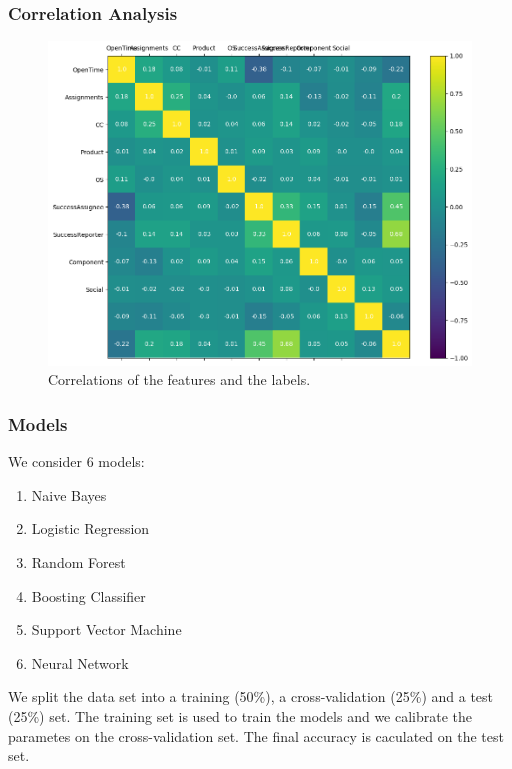 \documentclass[xcolor=sgvnames,serifs,notes,compress,professionalfont]{beamer}
\begin{document}
\begin{frame}
\frametitle{Correlation Analysis}
\begin{figure}
	\includegraphics[height=0.75\textheight]{pictures/correlations.png}    
	\caption{Correlations of the features and the labels.}
	\label{fig:corr}
\end{figure}
\end{frame}

\begin{frame}
\frametitle{Models}
We consider 6 models:
\begin{enumerate}
	\item Naive Bayes
	\item Logistic Regression
	\item Random Forest
	\item Boosting Classifier
	\item Support Vector Machine
	\item Neural Network
\end{enumerate}
We split the data set into a training (50\%), a cross-validation (25\%) and a test (25\%) set. The training set is used to train the models and we calibrate the parametes on the cross-validation set. The final accuracy is caculated on the test set.
\end{frame}
\end{document}

